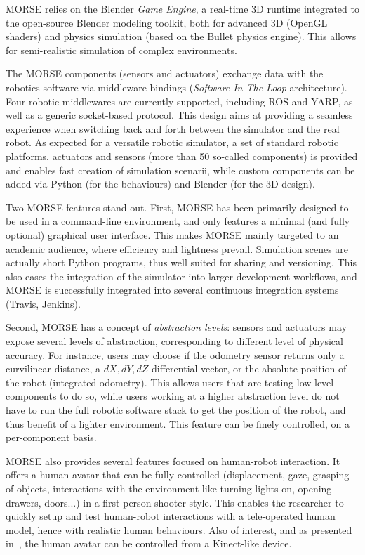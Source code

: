 \documentclass[conference]{IEEEtran}
\begin{document}
MORSE relies on the Blender \emph{Game Engine}, a real-time 3D runtime
integrated to the open-source Blender modeling toolkit, both for advanced 3D
(OpenGL shaders) and physics simulation (based on the {\sc Bullet} physics
engine). This allows for semi-realistic simulation of complex environments.

The MORSE components (sensors and actuators) exchange data with the robotics
software via middleware bindings (\emph{Software In The Loop} architecture).
Four robotic middlewares are currently supported, including ROS and YARP, as
well as a generic socket-based protocol. This design aims at providing a
seamless experience when switching back and forth between the simulator and the
real robot. As expected for a versatile robotic simulator, a set of standard
robotic platforms, actuators and sensors (more than 50 so-called components) is
provided and enables fast creation of simulation scenarii, while custom
components can be added via Python (for the behaviours) and Blender (for the 3D
design).

Two MORSE features stand out. First, MORSE has been primarily designed to be
used in a command-line environment, and only features a minimal (and fully
optional) graphical user interface. This makes MORSE mainly targeted to an
academic audience, where efficiency and lightness prevail.  Simulation scenes
are actually short Python programs, thus well suited for sharing and versioning.
This also eases the integration of the simulator into larger development
workflows, and MORSE is successfully integrated into several continuous
integration systems (Travis, Jenkins).

Second, MORSE has a concept of \emph{abstraction levels}: sensors and actuators may
expose several levels of abstraction, corresponding to different level of
physical accuracy. For instance, users may choose if the odometry sensor returns
only a curvilinear distance, a $dX, dY, dZ$ differential vector, or the absolute
position of the robot (integrated odometry). This allows users that are testing
low-level components to do so, while users working at a higher abstraction level
do not have to run the full robotic software stack to get the position of the
robot, and thus benefit of a lighter environment. This feature can be finely
controlled, on a per-component basis.

MORSE also provides several features focused on human-robot interaction. It
offers a human avatar that can be fully controlled (displacement, gaze, grasping
of objects, interactions with the environment like turning lights on, opening
drawers, doors...) in a first-person-shooter style. This enables the researcher
to quickly setup and test human-robot interactions with a tele-operated human
model, hence with realistic human behaviours. Also of interest, and as presented
in~\cite{lemaignan2012morse}, the human avatar can be controlled from a
Kinect-like device.
\end{document}
